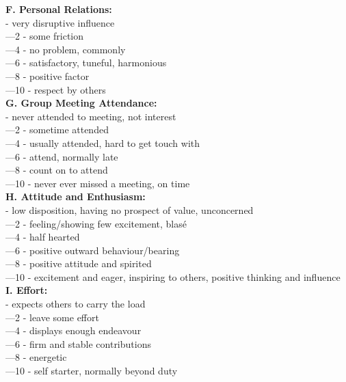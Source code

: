 \documentclass[11pt]{article}
\begin{document}
\textbf{F. Personal Relations:}\\
	\indent{}	- very disruptive influence\\
	\indent{}—2	- some friction\\
	\indent{}—4	- no problem, commonly\\
	\indent{}—6	- satisfactory, tuneful, harmonious\\ 
	\indent{}—8	- positive factor\\
	\indent{}—10	- respect by others\\

\textbf{G. Group Meeting Attendance:}\\
	\indent{}	- never attended to meeting, not interest\\
	\indent{}—2	- sometime attended \\
	\indent{}—4	- usually attended, hard to get touch with\\
	\indent{}—6	- attend, normally late\\
	\indent{}—8	- count on to attend\\
	\indent{}—10	- never ever missed a meeting, on time\\

\textbf{H. Attitude and Enthusiasm:}\\
	\indent{}	- low disposition, having no prospect of value, unconcerned \\
	\indent{}—2	- feeling/showing few excitement, blasé\\
	\indent{}—4	- half hearted \\
	\indent{}—6	- positive outward behaviour/bearing\\
	\indent{}—8	- positive attitude and spirited\\
	\indent{}—10	- excitement and eager, inspiring to others, positive thinking and influence\\

\textbf{I. Effort:}\\
	\indent{}	- expects others to carry the load\\
	\indent{}—2	- leave some effort\\
	\indent{}—4	- displays enough endeavour\\
	\indent{}—6	- firm and stable contributions\\
	\indent{}—8	- energetic\\
	\indent{}—10	- self starter, normally beyond duty\\
\end{document}
